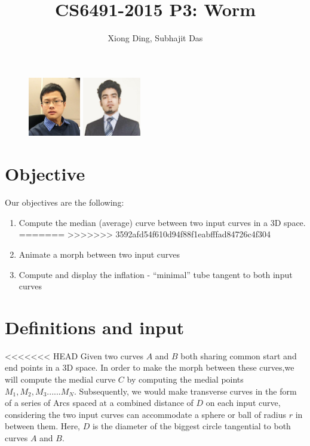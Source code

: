 \documentclass[twoside,11pt]{article}
\begin{document}
\title{CS6491-2015 P3: Worm}
\author{Xiong Ding, Subhajit Das}
\date{}
\maketitle
\begin{figure} [H]
    \centering
    \includegraphics[width=0.9in]{selfie}
    \includegraphics[width=1.0in]{das_PIC}
\end{figure}


\section{Objective}
Our objectives are the following:
 \begin{enumerate}
<<<<<<< HEAD
 \item Compute the median (average) curve between two input curves in a 3D space.
=======
>>>>>>> 3592afd54f610d94f88f1eabfffad84726c4f304
\item Animate a morph between two input curves 
\item Compute and display the inflation - “minimal” tube tangent to both input curves
 \end{enumerate}


\section{Definitions and input}
<<<<<<< HEAD
Given two curves $ A $ and $ B $ both sharing common start and end points in a 3D space. In order to make the morph between these curves,we will compute the medial curve $ C $ by computing the medial points $ M_1, M_2, M_3 ......M_N $.
Subsequently, we would make transverse curves in the form of a series of Arcs spaced at a combined distance of $D$ on each input curve, considering the two input curves can accommodate a sphere or ball of radius $ r $ in between them. Here, $D$ is the diameter of the biggest circle tangential to both curves $A$ and $B$.
\end{document}
